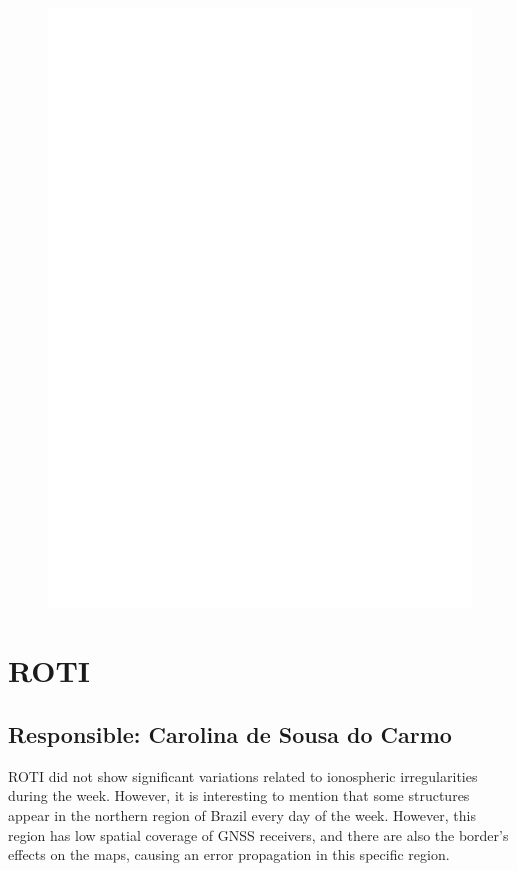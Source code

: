 \documentclass[a4paper, 10pt]{article}
\begin{document}
    
    \begin{figure}[H]
        \centering
        \includegraphics[width=14cm]{./figures/en_outfileScint_1.jpg}
    \end{figure} 
 

    \section{ROTI} 
 \subsection{Responsible: Carolina de Sousa do Carmo} 
 
ROTI did not show significant variations related to ionospheric irregularities during the week. However, it is interesting to mention that some structures appear in the northern region of Brazil every day of the week. However, this region has low spatial coverage of GNSS receivers, and there are also the border's effects on the maps, causing an error propagation in this specific region.
\end{document}
